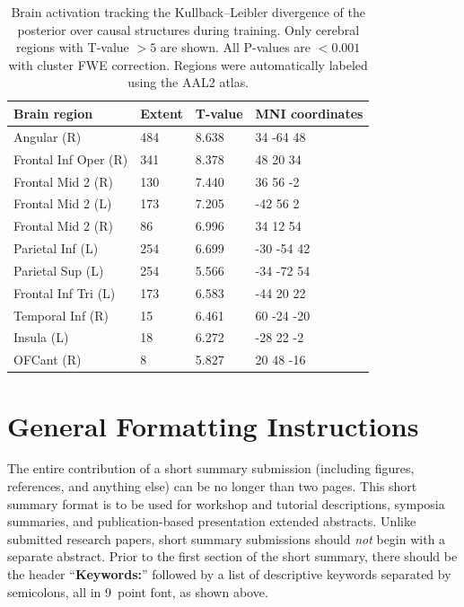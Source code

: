 \documentclass[10pt,letterpaper]{article}
\begin{document}
\begin{table}[!ht]
\begin{center} 
\caption{Brain activation tracking the Kullback--Leibler divergence of the posterior over causal structures during training. Only cerebral regions with T-value $ > 5$ are shown. All P-values are $< 0.001$ with cluster FWE correction. Regions were automatically labeled using the AAL2 atlas.} 
\label{kl-divergence-table} 
\vskip 0.12in
\begin{tabular}{llll} 
\hline
Brain region    &  Extent & T-value  & MNI coordinates \\
\hline
Angular (R) &	484	& 8.638 &	34	-64	48\\
Frontal Inf Oper (R) &	341 &	8.378& 48	20	34 \\
Frontal Mid 2 (R) &	130	& 7.440 &	36	56	-2 \\
Frontal Mid 2 (L) &	173	& 7.205 &	-42	56	2 \\
Frontal Mid 2 (R) &	86	& 6.996 &	34	12	54 \\
Parietal Inf (L) &	254 	& 6.699 &	-30	-54	42 \\
Parietal Sup (L)	 & 254	& 5.566 &	-34	-72	54 \\
Frontal Inf Tri (L) &	173	& 6.583 & -44	20	22 \\
Temporal Inf (R) &	 15	& 6.461 &	60	-24	-20 \\
Insula (L)	& 18	 & 6.272	& -28	22	-2 \\
OFCant (R)& 	8  &	5.827 &	20	48	-16 \\
\hline
\end{tabular} 
\end{center} 
\end{table}





\section{General Formatting Instructions}

The entire contribution of a short summary submission (including
figures, references, and anything else) can be no longer than two
pages. This short summary format is to be used for workshop and
tutorial descriptions, symposia summaries, and publication-based
presentation extended abstracts. Unlike submitted research papers,
short summary submissions should \emph{not} begin with a separate
abstract. Prior to the first section of the short summary, there
should be the header ``{\bf Keywords:}'' followed by a list of
descriptive keywords separated by semicolons, all in 9~point font, as
shown above.
\end{document}
